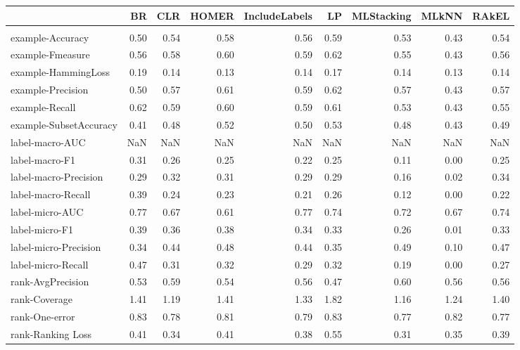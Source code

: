 \begin{tabular}{l|rrrrrrrr}

  & BR & CLR & HOMER & IncludeLabels & LP & MLStacking & MLkNN & RAkEL \\

\hline \\

example-Accuracy & 0.50 & 0.54 & 0.58 & 0.56 & 0.59 & 0.53 & 0.43 & 0.54 \\

example-Fmeasure & 0.56 & 0.58 & 0.60 & 0.59 & 0.62 & 0.55 & 0.43 & 0.56 \\

example-HammingLoss & 0.19 & 0.14 & 0.13 & 0.14 & 0.17 & 0.14 & 0.13 & 0.14 \\

example-Precision & 0.50 & 0.57 & 0.61 & 0.59 & 0.62 & 0.57 & 0.43 & 0.57 \\

example-Recall & 0.62 & 0.59 & 0.60 & 0.59 & 0.61 & 0.53 & 0.43 & 0.55 \\

example-SubsetAccuracy & 0.41 & 0.48 & 0.52 & 0.50 & 0.53 & 0.48 & 0.43 & 0.49 \\

label-macro-AUC & NaN & NaN & NaN & NaN & NaN & NaN & NaN & NaN \\

label-macro-F1 & 0.31 & 0.26 & 0.25 & 0.22 & 0.25 & 0.11 & 0.00 & 0.25 \\

label-macro-Precision & 0.29 & 0.32 & 0.31 & 0.29 & 0.29 & 0.16 & 0.02 & 0.34 \\

label-macro-Recall & 0.39 & 0.24 & 0.23 & 0.21 & 0.26 & 0.12 & 0.00 & 0.22 \\

label-micro-AUC & 0.77 & 0.67 & 0.61 & 0.77 & 0.74 & 0.72 & 0.67 & 0.74 \\

label-micro-F1 & 0.39 & 0.36 & 0.38 & 0.34 & 0.33 & 0.26 & 0.01 & 0.33 \\

label-micro-Precision & 0.34 & 0.44 & 0.48 & 0.44 & 0.35 & 0.49 & 0.10 & 0.47 \\

label-micro-Recall & 0.47 & 0.31 & 0.32 & 0.29 & 0.32 & 0.19 & 0.00 & 0.27 \\

rank-AvgPrecision & 0.53 & 0.59 & 0.54 & 0.56 & 0.47 & 0.60 & 0.56 & 0.56 \\

rank-Coverage & 1.41 & 1.19 & 1.41 & 1.33 & 1.82 & 1.16 & 1.24 & 1.40 \\

rank-One-error & 0.83 & 0.78 & 0.81 & 0.79 & 0.83 & 0.77 & 0.82 & 0.77 \\

rank-Ranking Loss & 0.41 & 0.34 & 0.41 & 0.38 & 0.55 & 0.31 & 0.35 & 0.39 \\

\end{tabular}
